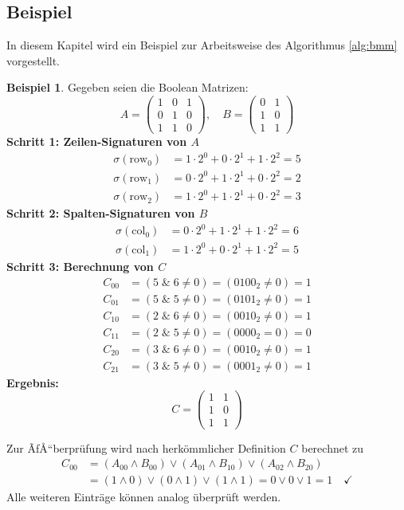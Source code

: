 ﻿\documentclass[a4paper,12pt]{article}
\theoremstyle{definition}
\newtheorem{beispiel}{Beispiel}
\begin{document}
\subsection{Beispiel}
In diesem Kapitel wird ein Beispiel zur Arbeitsweise des Algorithmus \ref{alg:bmm} vorgestellt.

\begin{beispiel}
	Gegeben seien die Boolean Matrizen:
	\[
	A = \begin{pmatrix}
		1 & 0 & 1 \\
		0 & 1 & 0 \\
		1 & 1 & 0
	\end{pmatrix}, \quad
	B = \begin{pmatrix}
		0 & 1 \\
		1 & 0 \\
		1 & 1
	\end{pmatrix}
	\]
	\textbf{Schritt 1: Zeilen-Signaturen von $A$}
	\begin{align*}
		\sigma(\text{row}_0) &= 1 \cdot 2^0 + 0 \cdot 2^1 + 1 \cdot 2^2 = 5 \\
		\sigma(\text{row}_1) &= 0 \cdot 2^0 + 1 \cdot 2^1 + 0 \cdot 2^2 = 2 \\
		\sigma(\text{row}_2) &= 1 \cdot 2^0 + 1 \cdot 2^1 + 0 \cdot 2^2 = 3
	\end{align*}
	\textbf{Schritt 2: Spalten-Signaturen von $B$}
	\begin{align*}
		\sigma(\text{col}_0) &= 0 \cdot 2^0 + 1 \cdot 2^1 + 1 \cdot 2^2 = 6 \\
		\sigma(\text{col}_1) &= 1 \cdot 2^0 + 0 \cdot 2^1 + 1 \cdot 2^2 = 5
	\end{align*}
	\textbf{Schritt 3: Berechnung von $C$}
	\begin{align*}
		C_{00} &= (5 \; \& \; 6 \neq 0) = (0100_2 \neq 0) = 1 \\
		C_{01} &= (5 \; \& \; 5 \neq 0) = (0101_2 \neq 0) = 1 \\
		C_{10} &= (2 \; \& \; 6 \neq 0) = (0010_2 \neq 0) = 1 \\
		C_{11} &= (2 \; \& \; 5 \neq 0) = (0000_2 = 0) = 0 \\
		C_{20} &= (3 \; \& \; 6 \neq 0) = (0010_2 \neq 0) = 1 \\
		C_{21} &= (3 \; \& \; 5 \neq 0) = (0001_2 \neq 0) = 1
	\end{align*}
	\textbf{Ergebnis:}
	\[
	C = \begin{pmatrix}
		1 & 1 \\
		1 & 0 \\
		1 & 1
	\end{pmatrix}
	\]
\end{beispiel}
Zur ÃƒÅ“berprüfung wird nach herkömmlicher Definition $C$ berechnet zu
\begin{align*}
	C_{00} &= (A_{00} \wedge B_{00}) \vee (A_{01} \wedge B_{10}) \vee (A_{02} \wedge B_{20}) \\
	&= (1 \wedge 0) \vee (0 \wedge 1) \vee (1 \wedge 1) = 0 \vee 0 \vee 1 = 1 \quad \checkmark
\end{align*}
Alle weiteren Einträge können analog überprüft werden.
\end{document}
